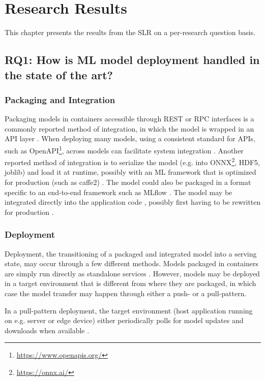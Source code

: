 \chapter{Research Results}
This chapter presents the results from the SLR on a per-research question basis.

\section{RQ1: How is ML model deployment handled in the state of the art?}
\subsection{Packaging and Integration}
Packaging models in containers accessible through REST or RPC interfaces is a commonly reported method of integration, in which the model is wrapped in an API layer \cite{Garcia2020, Li2017, Ruf2021, Crankshaw2017}.
When deploying many models, using a consistent standard for APIs, such as OpenAPI\footnote{\url{https://www.openapis.org/}}, across models can facilitate system integration \cite{Garcia2020}.
Another reported method of integration is to serialize the model (e.g. into ONNX\footnote{\url{https://onnx.ai/}}, HDF5, joblib) and load it at runtime, possibly with an ML framework that is optimized for production (such as caffe2) \cite{Hazelwood2018, Peticolas2019, Paeaekkoenen2020, Chahal2020}.
The model could also be packaged in a format specific to an end-to-end framework such as MLflow \cite{Chen2020}.
The model may be integrated directly into the application code \cite{Liu2020, Ruf2021, Granlund2021}, possibly first having to be rewritten for production \cite{Hazelwood2018}.

\subsection{Deployment}
Deployment, the transitioning of a  packaged and integrated model into a serving state, may occur through a few different methods.
Models packaged in containers are simply run directly as standalone services \cite{Liu2020,Ruf2021, Granlund2021, Li2017, Garcia2020}.
However, models may be deployed in a target environment that is different from where they are packaged, in which case the model transfer may happen through either a push- or a pull-pattern.

In a pull-pattern deployment, the target environment (host application running on e.g. server or edge device) either periodically polls for model updates and downloads when available \cite{Paeaekkoenen2020, Li2017, Peticolas2019}.

